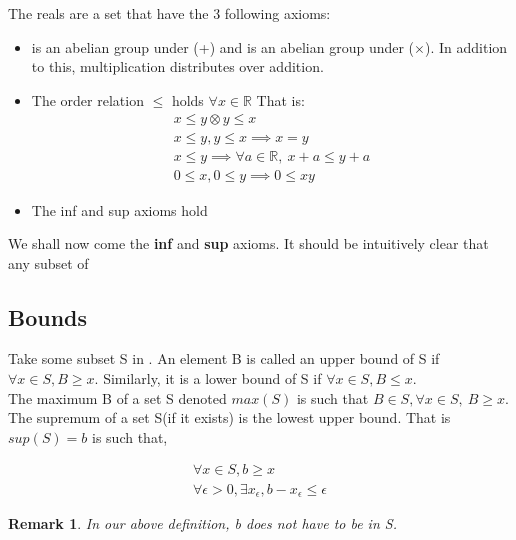 \documentclass[titlepage]{article}
\newtheorem{remark}{Remark}[section]
\begin{document}
\begin{tcolorbox}
The reals are a set that have the 3 following axioms:
\begin{itemize}
    \item {} is an abelian group under (+) and  is an abelian group under ($\times$). In addition to this, multiplication distributes over addition.
    \item The order relation $\leq$ holds $\forall x \in \mathbb{R}$ That is:
    \begin{align*}
        x \leq y \otimes y \leq x\\
        x \leq y, y \leq x \implies x = y\\
        x \leq y \implies \forall a \in \mathbb{R},\  x + a \leq y + a\\
        0 \leq x, 0 \leq y \implies 0 \leq xy
    \end{align*}
    \item The inf and sup axioms hold
\end{itemize}

We shall now come the \textbf{inf} and \textbf{sup} axioms. It should be intuitively clear that any subset of  
\end{tcolorbox}

\subsection{Bounds}
Take some subset S in . An element B is called an upper bound of S if $\forall x \in S, B \geq x$. Similarly, it is a lower bound of S if $\forall x \in S, B \leq x$.
\\
The maximum B of a set S denoted $max(S)$ is such that $B \in S, \forall x \in S, \ B \geq x$. 
\\
The supremum of a set S(if it exists) is the lowest upper bound. That is $sup(S) = b$ is such that,


    \begin{align}
        \forall x \in S, b \geq x\\
        \forall \epsilon > 0, \exists x_{\epsilon}, b - x_{\epsilon} \leq \epsilon
    \end{align}
    
    
    
    
    
\begin{remark}

   In our above definition, b does not have to be in S.

\end{remark}
\end{document}
